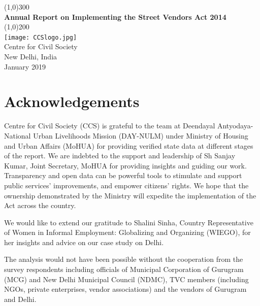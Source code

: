 \documentclass[a4paper, 12pt, twoside]{article}
\begin{document}
\newpage

\begin{titlepage}
\begin{center}
\line(1,0){300}\\
[0.25in]
\huge{\bfseries \textcolor{CCSbrown} {Annual Report on Implementing the Street Vendors Act 2014}} \\
[0.5cm]

\line(1,0){200}\\
[2in]
\texttt{[image: CCSlogo.jpg]} \\
[1.5cm]
\LARGE{Centre for Civil Society} \\
[1.5cm]
{\Large New Delhi, India} \\
{\Large January 2019} \\
[1.85cm]


\end{center}
\end{titlepage}

\section*{Acknowledgements}
Centre for Civil Society (CCS) is grateful to the team at Deendayal Antyodaya-National Urban Livelihoods Mission (DAY-NULM) under Ministry of Housing and Urban Affairs (MoHUA) for providing verified state data at different stages of the report. We are indebted to the support and leadership of Sh Sanjay Kumar, Joint Secretary, MoHUA for providing insights and guiding our work. Transparency and open data can be powerful tools to stimulate and support public services’ improvements, and empower citizens’ rights. We hope that the ownership demonstrated by the Ministry will expedite the implementation of the Act across the country.

We would like to extend our gratitude to Shalini Sinha, Country Representative of Women in Informal Employment: Globalizing and Organizing (WIEGO), for her insights and advice on our case study on Delhi.

The analysis would not have been possible without the cooperation from the survey respondents including officials of Municipal Corporation of Gurugram (MCG) and New Delhi Municipal Council (NDMC), TVC members (including NGOs, private enterprises, vendor associations) and the vendors of Gurugram and Delhi.
\end{document}
